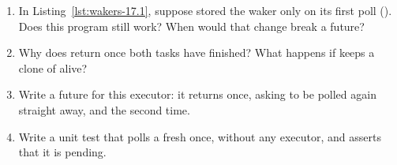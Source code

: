 \begin{Exercise}[title={Building an executor}]
    \begin{enumerate}
        \item In Listing~\ref{lst:wakers-17.1}, suppose  stored the waker only on its first poll (). Does this program still work? When would that change break a future?
        \item Why does  return once both tasks have finished? What happens if  keeps a clone of  alive?
        \item Write a  future for this executor: it returns  once, asking to be polled again straight away, and  the second time.
        \item Write a unit test that polls a fresh  once, without any executor, and asserts that it is pending.
    \end{enumerate}
\end{Exercise}
